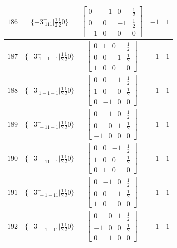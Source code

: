 \documentclass[fleqn,8pt]{jsarticle}
\begin{document}
\begin{longtable}{ccccc}
$ 186 $ & $ \{-3^{-}_{\,\,111}|\frac{1}{2} \frac{1}{2} 0\} $ & $ \begin{bmatrix} 0 & -1 & 0 & \frac{1}{2} \\ 0 & 0 & -1 & \frac{1}{2} \\ -1 & 0 & 0 & 0 \end{bmatrix} $ & $ -1 $ & $ 1 $ \\ \hline
$ 187 $ & $ \{-3^{-}_{\,\,1-1-1}|\frac{1}{2} \frac{1}{2} 0\} $ & $ \begin{bmatrix} 0 & 1 & 0 & \frac{1}{2} \\ 0 & 0 & -1 & \frac{1}{2} \\ 1 & 0 & 0 & 0 \end{bmatrix} $ & $ -1 $ & $ 1 $ \\ \hline
$ 188 $ & $ \{-3^{+}_{\,\,1-1-1}|\frac{1}{2} \frac{1}{2} 0\} $ & $ \begin{bmatrix} 0 & 0 & 1 & \frac{1}{2} \\ 1 & 0 & 0 & \frac{1}{2} \\ 0 & -1 & 0 & 0 \end{bmatrix} $ & $ -1 $ & $ 1 $ \\ \hline
$ 189 $ & $ \{-3^{-}_{\,\,-11-1}|\frac{1}{2} \frac{1}{2} 0\} $ & $ \begin{bmatrix} 0 & 1 & 0 & \frac{1}{2} \\ 0 & 0 & 1 & \frac{1}{2} \\ -1 & 0 & 0 & 0 \end{bmatrix} $ & $ -1 $ & $ 1 $ \\ \hline
$ 190 $ & $ \{-3^{+}_{\,\,-11-1}|\frac{1}{2} \frac{1}{2} 0\} $ & $ \begin{bmatrix} 0 & 0 & -1 & \frac{1}{2} \\ 1 & 0 & 0 & \frac{1}{2} \\ 0 & 1 & 0 & 0 \end{bmatrix} $ & $ -1 $ & $ 1 $ \\ \hline
$ 191 $ & $ \{-3^{-}_{\,\,-1-11}|\frac{1}{2} \frac{1}{2} 0\} $ & $ \begin{bmatrix} 0 & -1 & 0 & \frac{1}{2} \\ 0 & 0 & 1 & \frac{1}{2} \\ 1 & 0 & 0 & 0 \end{bmatrix} $ & $ -1 $ & $ 1 $ \\ \hline
$ 192 $ & $ \{-3^{+}_{\,\,-1-11}|\frac{1}{2} \frac{1}{2} 0\} $ & $ \begin{bmatrix} 0 & 0 & 1 & \frac{1}{2} \\ -1 & 0 & 0 & \frac{1}{2} \\ 0 & 1 & 0 & 0 \end{bmatrix} $ & $ -1 $ & $ 1 $ \\ \hline

\end{longtable}
\end{document}
